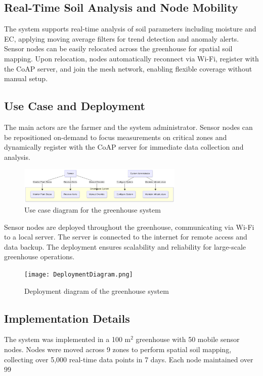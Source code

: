 \documentclass[12pt,a4paper]{article}
\begin{document}
\subsection{Real-Time Soil Analysis and Node Mobility}
The system supports real-time analysis of soil parameters including moisture and EC, applying moving average filters for trend detection and anomaly alerts. Sensor nodes can be easily relocated across the greenhouse for spatial soil mapping. Upon relocation, nodes automatically reconnect via Wi-Fi, register with the CoAP server, and join the mesh network, enabling flexible coverage without manual setup.


\subsection{Use Case and Deployment}
The main actors are the farmer and the system administrator. Sensor nodes can be repositioned on-demand to focus measurements on critical zones and dynamically register with the CoAP server for immediate data collection and analysis.

\begin{figure}[H]
    \centering
    \includegraphics[width=0.7\textwidth]{images/useCaseDiagram.png}
    \caption{Use case diagram for the greenhouse system}
    \label{fig:usecase}
\end{figure}

Sensor nodes are deployed throughout the greenhouse, communicating via Wi-Fi to a local server. The server is connected to the internet for remote access and data backup. The deployment ensures scalability and reliability for large-scale greenhouse operations.

\begin{figure}[H]
    \centering
    \texttt{[image: DeploymentDiagram.png]}
    \caption{Deployment diagram of the greenhouse system}
    \label{fig:deployment}
\end{figure}

\subsection{Implementation Details}
The system was implemented in a 100 m$^2$ greenhouse with 50 mobile sensor nodes. Nodes were moved across 9 zones to perform spatial soil mapping, collecting over 5,000 real-time data points in 7 days. Each node maintained over 99%
\end{document}
